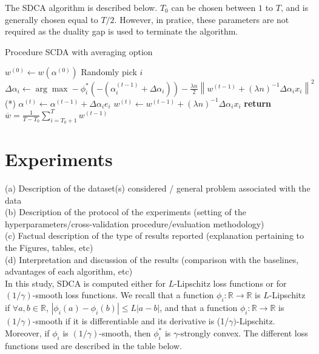 \documentclass{article}
\newcommand{\abs}[1]{\left|#1\right|}
\newcommand{\norm}[1]{\left\|#1 \right\|}
\begin{document}
The SDCA algorithm is described below.
$T_0$ can be chosen between $1$ to $T$, and is generally chosen equal to $T/2$.
However, in pratice, these parameters are not required as the duality gap is used to terminate the algorithm.

\begin{algorithm}
\caption{Procedure SCDA with averaging option}
\begin{algorithmic}
\State $w^{(0)} \gets w(\alpha^{(0)})$
\State Randomly pick $i$
\State $\Delta \alpha_i \gets \arg \max -\phi^{*}_i(-(\alpha_i^{(t-1)}+\Delta \alpha_i))-\frac{\lambda n}{2}\norm{w^{(t-1)}+(\lambda n)^{-1}\Delta \alpha_i x_i}^2$ \qquad \qquad \qquad \qquad \qquad (*)
\State $\alpha^{(t)} \gets \alpha^{(t-1)} + \Delta \alpha_i e_i$
\State $w^{(t)} \gets w^{(t-1)} + (\lambda n)^{-1} \Delta \alpha_i x_i$
\EndFor
\State \textbf{return} $\overline{w} = \frac{1}{T-T_0} \sum_{i = T_0+1}^T w^{(t-1)}$
\EndProcedure
\end{algorithmic}
\end{algorithm}




\newpage

\section{Experiments}
(a) Description of the dataset(s) considered / general problem associated with the data \\
(b) Description of the protocol of the experiments (setting of the hyperparameters/cross-validation
procedure/evaluation methodology) \\
(c) Factual description of the type of results reported (explanation pertaining to the Figures, tables, etc) \\
(d) Interpretation and discussion of the results (comparison with the baselines, advantages of each
algorithm, etc) \\

In this study, SDCA is computed either for $L$-Lipschitz loss functions or for $(1/\gamma)$-smooth loss functions.
We recall that a function $\phi_i : \mathbb{R} \rightarrow \mathbb{R}$ is $L$-Lipschitz if $\forall a,b \in \mathbb{R}$, $\abs{\phi_i(a)-\phi_i(b)} \leq L \abs{a-b}$, and that a function $\phi_i : \mathbb{R} \rightarrow \mathbb{R}$ is $(1/\gamma)$-smooth if it is differentiable and its derivative is (1/$\gamma)$-Lipschitz.
Moreover, if $\phi_i$ is $(1/\gamma)$-smooth, then $\phi_i^{*}$ is $\gamma$-strongly convex.
The different loss functions used are described in the table below.
\end{document}
